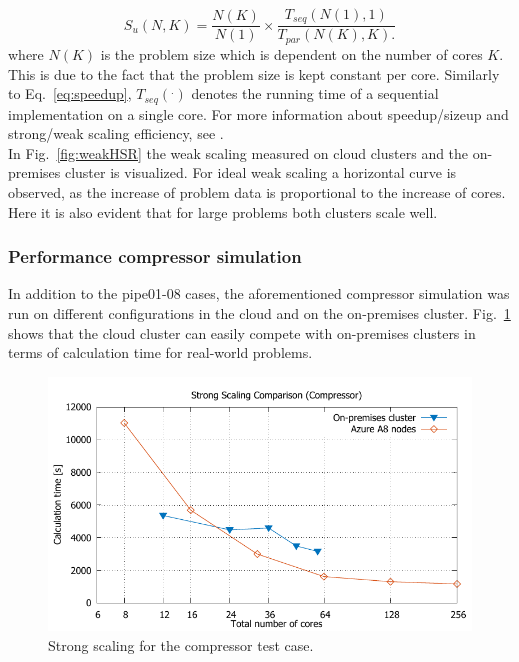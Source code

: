 \documentclass[a4paper,twoside]{article}
\begin{document}
\begin{equation}
\label{eq:sizeup}
S_u(N,K) = \frac{N(K)}{N(1)} \times \frac{T_{seq}(N(1),1)}{T_{par}(N(K),K).}
\end{equation}
where $N(K)$ is the problem size which is dependent on the number of cores $K$. This is due to the fact that the problem size is kept constant per core. Similarly to Eq.~\ref{eq:speedup}, $T_{seq}(^.)$ denotes the running time of a sequential implementation on a single core. For more information about speedup/sizeup and strong/weak scaling efficiency, see \cite{kaminsky15}.\\
In Fig.~\ref{fig:weakHSR} the weak scaling measured on cloud clusters and the on-premises cluster is visualized. For ideal weak scaling a horizontal curve is observed, as the increase of problem data is proportional to the increase of cores. Here it is also evident that for large problems both clusters scale well. 

\subsubsection{Performance compressor simulation}
In addition to the pipe01-08 cases, the aforementioned compressor simulation was run on different configurations in the cloud and on the on-premises cluster. Fig.~\ref{fig:scalingCompressor} shows that the cloud cluster can easily compete with on-premises clusters in terms of calculation time for real-world problems.

 
\begin{figure}
	\centering
	\includegraphics[width=\linewidth]{gplt-compressor}
	\caption{Strong scaling for the compressor test case. }
	\label{fig:scalingCompressor}
\end{figure}
\end{document}
